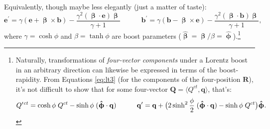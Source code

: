 \documentclass[12pt]{article}
\renewcommand{\vv}[1]{\mathbf{#1}}
\newcommand{\vvbeta}{\bm{\upbeta}}
\newcommand{\hatbeta}{\bm{\hat{\upbeta}}}
\newcommand{\hatphi}{\bm{\hat{\upphi}}}
\begin{document}
Equivalently, though maybe less elegantly (just a matter of taste):
\begin{equation*}
\vv e^\prime = \gamma \left( \vv e + \vvbeta \times \vv b \right) - \dfrac{\gamma^2 (\vvbeta \cdot \vv e) \vvbeta}{\gamma + 1} \qquad \quad \vv b^\prime = \gamma \left( \vv b - \vvbeta \times \vv e \right) - \dfrac{\gamma^2 (\vvbeta \cdot \vv b) \vvbeta}{\gamma + 1},
\end{equation*}
where $\gamma = \cosh{\phi}$ and $\beta = \tanh{\phi}$ are boost parameters ($\hatbeta = \vvbeta / \beta = \hatphi$).\footnote{Naturally, transformations of \emph{four-vector components} under a Lorentz boost in an arbitrary direction can likewise be expressed in terms of the boost-rapidity. From Equations \ref{eq:lt3} (for the components of the four-position $\vv R$), it's not difficult to show that for some four-vector $\vv Q = \langle Q^{ct}, \vv q \rangle$, that's:
\begin{equation*}
Q^{\prime  \mkern1.5mu ct} = \cosh \phi \; Q^{ct} - \sinh \phi \; ( \hatphi \cdot \vv q ) \qquad \quad
\vv q^{\prime} = \vv q + \big( 2 \sinh^2 \frac{\phi}{2} \; ( \hatphi \cdot \vv q ) - \sinh \phi \; Q^{ct} \big) \hatphi .
\end{equation*}}
\end{document}
